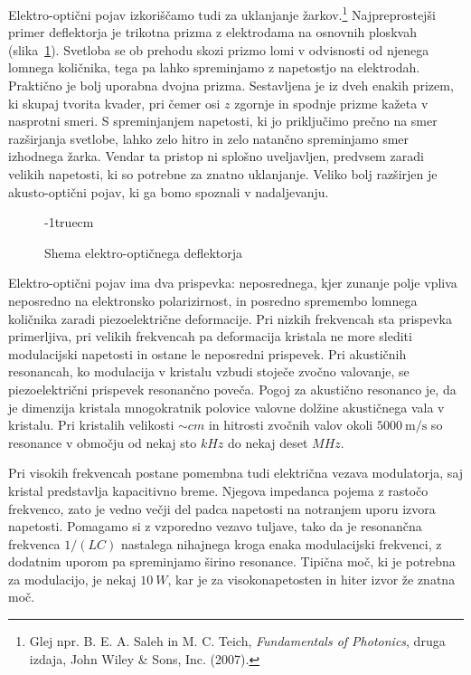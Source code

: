 \begin{remark}
Elektro-optični pojav izkoriščamo tudi za uklanjanje žarkov.\footnote{Glej npr. 
B. E. A. Saleh in M. C. Teich, 
{\it Fundamentals of Photonics}, druga izdaja, John Wiley \& Sons, Inc. (2007).}
Najpreprostejši primer deflektorja je trikotna prizma z elektrodama na osnovnih 
ploskvah (slika~\ref{fig:deflshema}). Svetloba se ob prehodu skozi prizmo lomi v odvisnosti od njenega 
lomnega količnika, tega pa lahko spreminjamo 
z napetostjo na elektrodah. Praktično je bolj uporabna dvojna prizma. Sestavljena je iz dveh enakih 
prizem, ki skupaj tvorita kvader, pri čemer osi $z$ zgornje in spodnje prizme
kažeta v nasprotni smeri. S spreminjanjem napetosti, ki jo priključimo prečno na smer
razširjanja svetlobe, lahko zelo hitro in zelo natančno spreminjamo smer izhodnega žarka. 
Vendar ta pristop ni splošno uveljavljen, predvsem zaradi velikih napetosti, ki so 
potrebne za znatno uklanjanje. Veliko bolj razširjen je akusto-optični pojav, ki ga 
bomo spoznali v nadaljevanju. 
\begin{figure}[ht]
\centering
\def\svgwidth{85truemm} 

\caption{Shema elektro-optičnega deflektorja}
\vglue-1truecm
\label{fig:deflshema}
\end{figure}
\end{remark}
\begin{remark}
Elektro-optični pojav ima dva prispevka: neposrednega, kjer zunanje polje 
vpliva neposredno na elektronsko polarizirnost, in posredno spremembo
lomnega količnika zaradi piezoelektrične deformacije. Pri nizkih frekvencah sta prispevka 
primerljiva, pri velikih frekvencah pa deformacija kristala ne more slediti
modulacijski napetosti in ostane le neposredni prispevek. Pri akustičnih resonancah, ko 
modulacija v kristalu vzbudi stoječe zvočno valovanje, se piezoelektrični 
prispevek resonančno poveča. Pogoj za akustično resonanco je, da je dimenzija 
kristala mnogokratnik polovice valovne dolžine akustičnega vala v kristalu. 
Pri kristalih velikosti $\sim \si{cm}$ in hitrosti zvočnih valov okoli
$5000~\si{\m/\s}$ so resonance v območju od nekaj sto $\si{kHz}$ do
nekaj deset $\si{MHz}$. 

Pri visokih frekvencah postane pomembna tudi električna vezava modulatorja,
saj kristal predstavlja kapacitivno breme. Njegova impedanca pojema z 
rastočo frekvenco, zato je vedno večji del padca napetosti na notranjem 
uporu izvora napetosti. Pomagamo si z vzporedno vezavo tuljave, 
tako da je resonančna frekvenca $1/(LC)$ nastalega nihajnega kroga 
enaka modulacijski frekvenci, z dodatnim uporom pa spreminjamo širino resonance.
Tipična moč, ki je potrebna za modulacijo, je nekaj $10~\si{W}$, 
kar je za visokonapetosten in hiter izvor že znatna moč. 
\end{remark}

